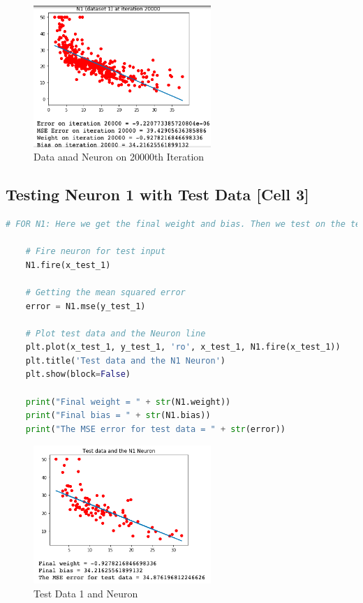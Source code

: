 \documentclass[a4paper, 12pt]{article}
\begin{document}
    \begin{figure}[h!]
        \centering
        \captionsetup{justification=centering}
        \centering
            \includegraphics[width=0.6\textwidth]{2.png}
            \caption{Data anad Neuron on 20000th Iteration}
    \end{figure}

    \pagebreak

    \subsection{Testing Neuron 1 with Test Data [Cell 3]}

    \begin{lstlisting}[language=python, caption=Dataset 1 Testing Code (Cell 3)]
    # FOR N1: Here we get the final weight and bias. Then we test on the test data

    # Fire neuron for test input
    N1.fire(x_test_1)
    
    # Getting the mean squared error 
    error = N1.mse(y_test_1)
    
    # Plot test data and the Neuron line
    plt.plot(x_test_1, y_test_1, 'ro', x_test_1, N1.fire(x_test_1))
    plt.title('Test data and the N1 Neuron')
    plt.show(block=False)
    
    print("Final weight = " + str(N1.weight))
    print("Final bias = " + str(N1.bias))
    print("The MSE error for test data = " + str(error))\end{lstlisting}
        
    \begin{figure}[h!]
        \centering
        \captionsetup{justification=centering}
        \centering
            \includegraphics[width=0.6\textwidth]{3.png}
            \caption{Test Data 1 and Neuron}
    \end{figure}
\end{document}
